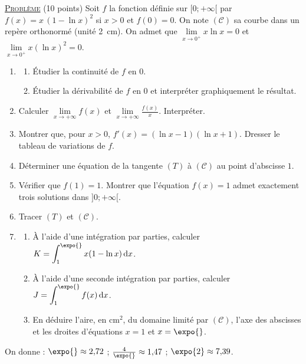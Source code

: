\noindent \underline{\textsc{Probl\`eme}} (10 points) \newline
Soit $f$ la fonction d\'efinie sur $[0 ; +\infty[$ par $f(x) = x\,(1 - \ln x)^2$ si $x > 0$ et $f(0) = 0$.
On note $(\mathscr{C})$ sa courbe dans un rep\`ere orthonorm\'e (unit\'e 2~cm).
On admet que $\lim\limits_{x \to 0^+} x \ln x = 0$ et $\lim\limits_{x \to 0^+} x (\ln x)^2 = 0$.
\begin{enumerate}
      \item \begin{enumerate}
            \item \'Etudier la continuit\'e de $f$ en $0$.
            \item \'Etudier la d\'erivabilit\'e de $f$ en $0$ et interpr\'eter graphiquement le r\'esultat.
            \end{enumerate}
      \item Calculer $\lim\limits_{x \to +\infty} f(x)$ et $\lim\limits_{x \to +\infty} \frac{f(x)}{x}$. Interpr\'eter.
      \item Montrer que, pour $x > 0$, $f'(x) = (\ln x - 1)(\ln x + 1)$. Dresser le tableau de variations de $f$.
      \item D\'eterminer une \'equation de la tangente $(T)$ \`a $(\mathscr{C})$ au point d'abscisse $1$.
      \item V\'erifier que $f(1) = 1$. Montrer que l'\'equation $f(x) = 1$ admet exactement trois solutions dans $]0 ; +\infty[$.
      \item Tracer $(T)$ et $(\mathscr{C})$.
      \item \begin{enumerate}
            \item \`A l'aide d'une int\'egration par parties, calculer $K = \displaystyle\int_1^{\expo{}} x(1 - \ln x)\,\mathrm{d}x$.
            \item \`A l'aide d'une seconde int\'egration par parties, calculer $J = \displaystyle\int_1^{\expo{}} f(x)\,\mathrm{d}x$.
            \item En d\'eduire l'aire, en cm$^2$, du domaine limit\'e par $(\mathscr{C})$, l'axe des abscisses et les droites
                  d'\'equations $x = 1$ et $x = \expo{}$.
            \end{enumerate}
\end{enumerate}
\begin{center}
On donne : $\expo{} \approx 2{,}72$ ; $\frac{4}{\expo{}} \approx 1{,}47$ ; $\expo{2} \approx 7{,}39$.
\end{center}


